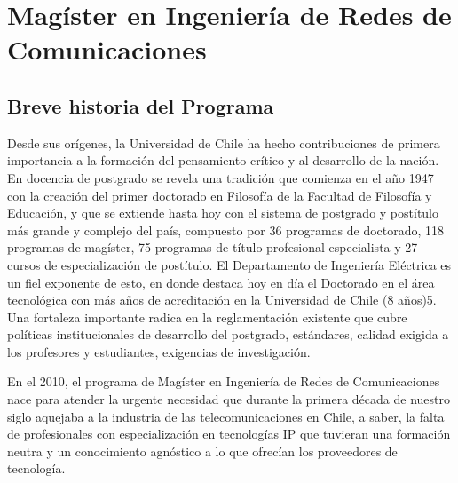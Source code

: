 \section{Magíster en Ingeniería de Redes de Comunicaciones}

\subsection{Breve historia del Programa}

Desde sus orígenes, la Universidad de Chile ha hecho contribuciones de primera importancia a
la formación del pensamiento crítico y al desarrollo de la nación. En docencia de postgrado
se revela una tradición que comienza en el año 1947 con la creación del primer doctorado en
Filosofía de la Facultad de Filosofía y Educación, y que se extiende hasta hoy con el sistema
de postgrado y postítulo más grande y complejo del país, compuesto por 36 programas de
doctorado, 118 programas de magíster, 75 programas de título profesional especialista y 27 cursos
de especialización de postítulo. El Departamento de Ingeniería Eléctrica es un fiel exponente de
esto, en donde destaca hoy en día el Doctorado en el área tecnológica con más años de acreditación
en la Universidad de Chile (8 años)5. Una fortaleza importante radica en la reglamentación existente
que cubre políticas institucionales de desarrollo del postgrado, estándares, calidad exigida a los
profesores y estudiantes, exigencias de investigación.


En el 2010, el programa de Magíster en Ingeniería de Redes de Comunicaciones nace para atender la urgente necesidad que durante la primera década de nuestro siglo aquejaba a la industria de las telecomunicaciones en Chile, a saber, la falta de profesionales con especialización en tecnologías IP que tuvieran una formación neutra y un conocimiento agnóstico a lo que ofrecían los proveedores de tecnología.


